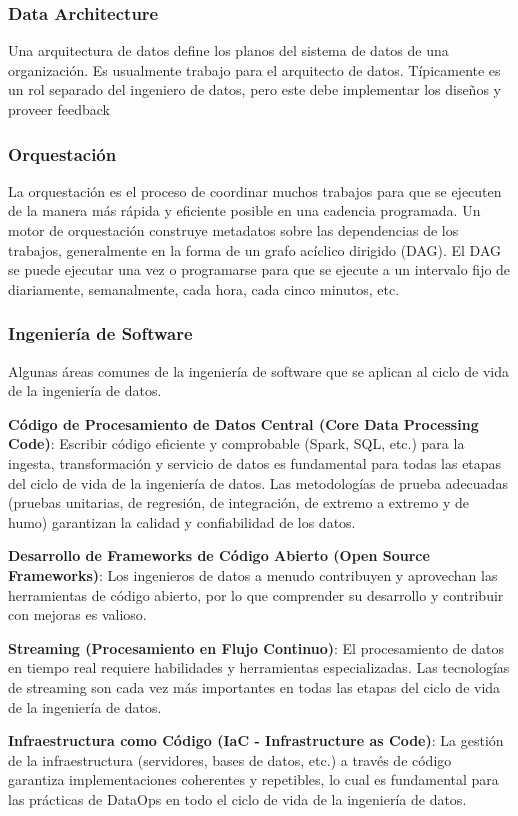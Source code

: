 \documentclass[12pt]{book}
\begin{document}
\subsubsection{Data Architecture}
Una arquitectura de datos define los planos del sistema de datos de una organización. Es usualmente trabajo para el arquitecto de datos. 
Típicamente es un rol separado del ingeniero de datos, pero este debe implementar los diseños y proveer feedback

\subsubsection{Orquestación}
La orquestación es el proceso de coordinar muchos trabajos para que se ejecuten de la manera más rápida y eficiente posible en una cadencia programada. Un motor de orquestación construye metadatos sobre las dependencias de los trabajos, generalmente en la forma de un grafo acíclico dirigido (DAG). El DAG se puede ejecutar una vez o programarse para que se ejecute a un intervalo fijo de diariamente, semanalmente, cada hora, cada cinco minutos, etc.
\subsubsection{Ingeniería de Software}
Algunas áreas comunes de la ingeniería de software que se aplican al ciclo de vida de la ingeniería de datos.

\textbf{Código de Procesamiento de Datos Central (Core Data Processing Code)}: Escribir código eficiente y comprobable (Spark, SQL, etc.) para la ingesta, transformación y servicio de datos es fundamental para todas las etapas del ciclo de vida de la ingeniería de datos. Las metodologías de prueba adecuadas (pruebas unitarias, de regresión, de integración, de extremo a extremo y de humo) garantizan la calidad y confiabilidad de los datos.

\textbf{Desarrollo de Frameworks de Código Abierto (Open Source Frameworks)}: Los ingenieros de datos a menudo contribuyen y aprovechan las herramientas de código abierto, por lo que comprender su desarrollo y contribuir con mejoras es valioso.

\textbf{Streaming (Procesamiento en Flujo Continuo)}: El procesamiento de datos en tiempo real requiere habilidades y herramientas especializadas. Las tecnologías de streaming son cada vez más importantes en todas las etapas del ciclo de vida de la ingeniería de datos.

\textbf{Infraestructura como Código (IaC - Infrastructure as Code)}: La gestión de la infraestructura (servidores, bases de datos, etc.) a través de código garantiza implementaciones coherentes y repetibles, lo cual es fundamental para las prácticas de DataOps en todo el ciclo de vida de la ingeniería de datos.
\end{document}
